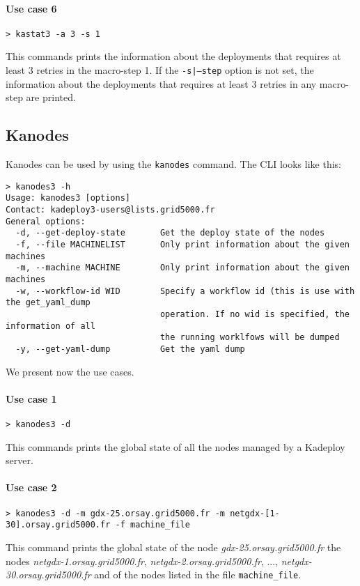 \documentclass[a4wide,10pt,oneside]{book}
\begin{document}
\paragraph{Use case 6}
\begin{verbatim}
> kastat3 -a 3 -s 1
\end{verbatim}
This commands prints the information about the deployments that requires at least 3 retries in the macro-step 1. If the \texttt{-s|--step} option is not set, the information about the deployments that requires at least 3 retries in any macro-step are printed.


\subsection{Kanodes}\label{sec:kanodes}
Kanodes can be used by using the \texttt{kanodes} command. The CLI looks like this:
\begin{small}
\begin{verbatim}
> kanodes3 -h
Usage: kanodes3 [options]
Contact: kadeploy3-users@lists.grid5000.fr
General options:
  -d, --get-deploy-state       Get the deploy state of the nodes
  -f, --file MACHINELIST       Only print information about the given machines
  -m, --machine MACHINE        Only print information about the given machines
  -w, --workflow-id WID        Specify a workflow id (this is use with the get_yaml_dump 
                               operation. If no wid is specified, the information of all
                               the running worklfows will be dumped
  -y, --get-yaml-dump          Get the yaml dump
\end{verbatim}
\end{small}

We present now the use cases.
\paragraph{Use case 1}
\begin{verbatim}
> kanodes3 -d
\end{verbatim}
This commands prints the global state of all the nodes managed by a Kadeploy server.

\paragraph{Use case 2}
\begin{verbatim}
> kanodes3 -d -m gdx-25.orsay.grid5000.fr -m netgdx-[1-30].orsay.grid5000.fr -f machine_file
\end{verbatim}
This command prints the global state of the node \textit{gdx-25.orsay.grid5000.fr} the nodes \textit{netgdx-1.orsay.grid5000.fr}, \textit{netgdx-2.orsay.grid5000.fr}, ..., \textit{netgdx-30.orsay.grid5000.fr} and of the nodes listed in the file \texttt{machine\_file}.
\end{document}
